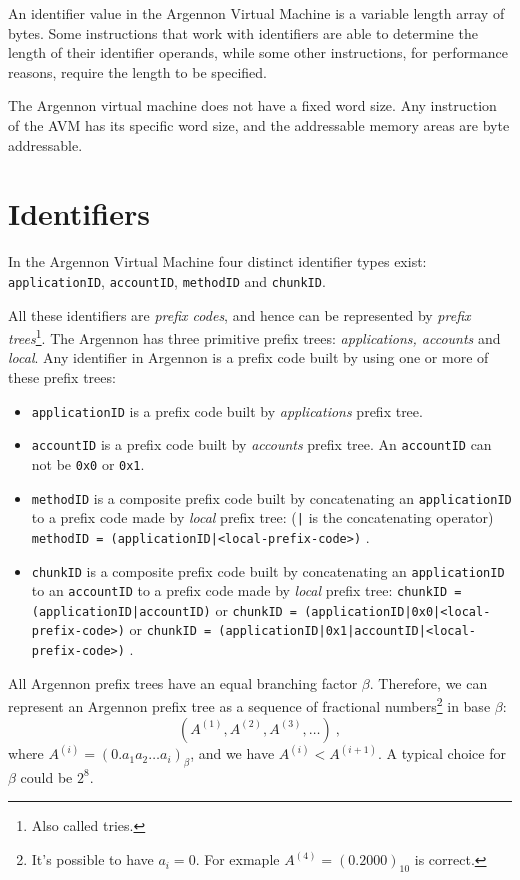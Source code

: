 An identifier value in the Argennon Virtual Machine is a variable length array of bytes. Some instructions
that work with identifiers are able to determine the length of their identifier operands, while some
other instructions, for performance reasons, require the length to be specified.

The Argennon virtual machine does not have a fixed word size. Any instruction of the AVM has
its specific word size, and the addressable memory areas are byte addressable.


\section{Identifiers}\label{sec:identifiers}

In the Argennon Virtual Machine four distinct identifier types exist: \texttt{applicationID}, \texttt{accountID},
\texttt{methodID} and \texttt{chunkID}.

All these identifiers are \emph{prefix codes}, and hence can be represented by
\emph{prefix trees}\footnote{Also called tries.}. The Argennon has three primitive prefix trees:
\emph{applications, accounts} and \emph{local}. Any identifier in Argennon is a
prefix code built by using one or more of these prefix trees:
\begin{itemize}
    \item \texttt{applicationID} is a prefix code built by \emph{applications} prefix tree.
    \item \texttt{accountID} is a prefix code built by \emph{accounts} prefix tree. An \texttt{accountID} can
    not be \texttt{0x0} or \texttt{0x1}.
    \item \texttt{methodID} is a composite prefix code built by concatenating an \texttt{applicationID} to
    a prefix code made by \emph{local} prefix tree: (\texttt{|} is the concatenating operator)
    \subitem \texttt{methodID = (applicationID|<local-prefix-code>)} .
    \item \texttt{chunkID} is a composite prefix code built by concatenating an \texttt{applicationID} to
    an \texttt{accountID} to a prefix code made by \emph{local} prefix tree:
    \subitem \texttt{chunkID = (applicationID|accountID)} or
    \subitem \texttt{chunkID = (applicationID|0x0|<local-prefix-code>)} or
    \subitem \texttt{chunkID = (applicationID|0x1|accountID|<local-prefix-code>)} .
\end{itemize}

All Argennon prefix trees have an equal branching factor \(\beta\). Therefore, we can represent an Argennon
prefix tree as a sequence of fractional numbers\footnote{It's possible to have \(a_i=0\). For
exmaple \(A^{(4)}=(0.2000)_{10}\) is correct.} in base \(\beta\):
\[
    (A^{(1)},A^{(2)},A^{(3)},\dots)\ ,
\]
where \(A^{(i)}=(0.a_{1}a_{2}\dots a_{i})_\beta\), and we have \(A^{(i)}<A^{(i+1)}\). A typical choice for \(\beta\)
could be \(2^8\).

